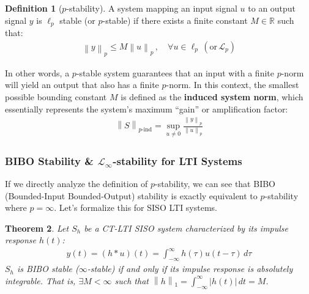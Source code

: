 \documentclass[11pt, a4paper, twoside]{article}
\newcommand{\norm}[1]{\left\lVert#1\right\rVert}
\newcommand{\abs}[1]{\left\lvert#1\right\rvert}
\newcounter{lecnum}
\theoremstyle{plain}
\newtheorem{theorem}{Theorem}[lecnum]
\theoremstyle{definition}
\newtheorem{definition}[theorem]{Definition}
\begin{document}
\begin{definition}[$p$-stability]
A system mapping an input signal $u$ to an output signal $y$ is $\ell_p$ stable (or $p$-stable) if there exists a finite constant $M \in \mathbb{R}$ such that:
%
\begin{align*}
	\norm{y}_p \leq M \norm{u}_p \, , \quad \forall u \in \ell_{p} \, (\mathrm{or} \, \mathcal{L}_{p})
\end{align*}
\end{definition}

In other words, a $p$-stable system guarantees that an input with a finite $p$-norm will yield an output that also has a finite $p$-norm. In this context, the smallest possible bounding constant $M$ is defined as the \textbf{induced system norm}, which essentially represents the system's maximum ``gain'' or amplification factor:
%
\begin{align*}
	\norm{S}_{p\text{-ind}} = \sup_{u \neq 0} \frac{\norm{y}_p}{\norm{u}_p}
\end{align*}

\subsubsection*{BIBO Stability \& $\mathcal{L}_{\infty}$-stability for LTI Systems}

If we directly analyze the definition of $p$-stability, we can see that BIBO (Bounded-Input Bounded-Output) stability is exactly equivalent to $p$-stability where $p = \infty$. Let's formalize this for SISO LTI systems.

\begin{theorem}
Let $S_{h}$ be a CT-LTI SISO system characterized by its impulse response $h(t)$:
%
\begin{align*}
y(t) = (h * u)(t) = \int_{-\infty}^{\infty} h(\tau) u(t - \tau) \, d\tau 
\end{align*}
%
$S_{h}$ is BIBO stable ($\infty$-stable) if and only if its impulse response is absolutely integrable. That is, $\exists M < \infty$ such that $\norm{h}_1 = \int_{-\infty}^{\infty} \abs{h(t)} \, dt = M$.
\end{theorem}
\end{document}
